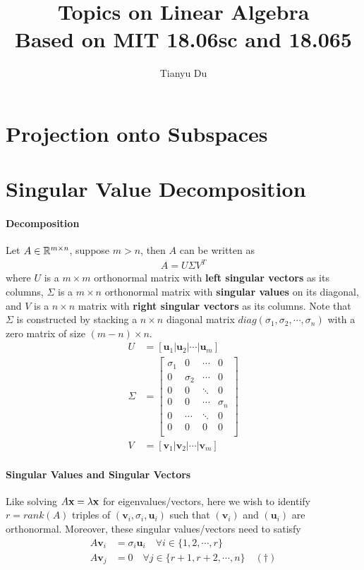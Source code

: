 \documentclass[11pt]{article}
\title{Topics on Linear Algebra \\ \small Based on MIT 18.06sc and 18.065}
\author{Tianyu Du}
\begin{document}
	\maketitle
	\section{Projection onto Subspaces}
	\section{Singular Value Decomposition}
	\paragraph{Decomposition}
	Let $A \in \mathbb{R}^{m \times n}$, suppose $m > n$, then $A$ can be written as
		\begin{align}
			A = U \Sigma V^T
		\end{align}
	where $U$ is a $m \times m$ orthonormal matrix with \textbf{left singular vectors} as its columns,
	$\Sigma$ is a $m \times n$ orthonormal matrix with \textbf{singular values} on its diagonal, and $V$ is a $n \times n$ matrix with \textbf{right singular vectors} as its columns.
	Note that $\Sigma$ is constructed by stacking a $n \times n$ diagonal matrix $diag(\sigma_1, \sigma_2, \cdots, \sigma_n)$ with a zero matrix of size $(m-n) \times n$.
	\begin{align}
		U &= [\mathbf{u}_1 | \mathbf{u}_2 |\cdots | \mathbf{u}_m] \\
		\Sigma &= \begin{bmatrix}
			\sigma_1 & 0 & \cdots & 0 \\
			0 & \sigma_2 & \cdots & 0 \\
			0 & 0 & \ddots & 0 \\
			0 & 0 & \cdots & \sigma_n \\
			0 & \cdots & \ddots & 0 \\
			0 & 0 & 0 & 0 \\
		\end{bmatrix} \\
		V &= [\mathbf{v}_1 | \mathbf{v}_2 | \cdots | \mathbf{v}_m]
	\end{align}
	\paragraph{Singular Values and Singular Vectors} Like solving $A \textbf{x} = \lambda \textbf{x}$ for eigenvalues/vectors, here we wish to identify $r = rank(A)$ triples of $(\mathbf{v}_i, \sigma_i, \mathbf{u}_i)$ such that $(\mathbf{v}_i)$ and $(\mathbf{u}_i)$ are orthonormal.
	Moreover, these singular values/vectors need to satisfy
	\begin{align}
		A \mathbf{v}_i &= \sigma_i \mathbf{u}_i\quad \forall i \in \{1, 2, \cdots, r\} \\
		A \mathbf{v}_j &= 0\quad \forall j \in \{r+1, r+2, \cdots, n\}\quad (\dagger)
	\end{align}
\end{document}
